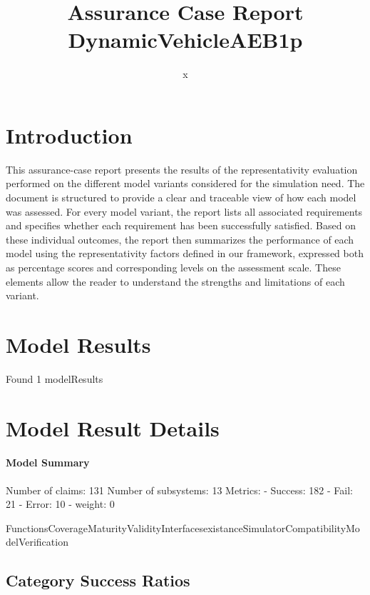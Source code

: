\documentclass{article}
\title{Assurance Case Report DynamicVehicleAEB1p}
\author{x}
\begin{document}
	\maketitle
	\section{Introduction}
	This assurance-case report presents the results of the 
	representativity evaluation performed on the different model variants considered for 
	the simulation need. The document is structured to provide a clear and traceable view of how 
	each model was assessed. For every model variant, the report lists all associated requirements
	 and specifies whether each requirement has been successfully satisfied. Based on these 
	individual outcomes, the report then summarizes the performance of each model using the 
	representativity factors defined in our framework, expressed both as percentage scores 
	and corresponding levels on the assessment scale. These elements allow the reader to understand 
	the strengths and limitations of each variant.
	 
	\section{Model Results}
    Found 1 modelResults
		
			\section{Model Result Details} 
			\paragraph{Model Summary}
			Number of claims: 131
			Number of subsystems: 13
			Metrics:
			- Success: 182
			- Fail: 21
			- Error: 10
			- weight: 0
			
			FunctionsCoverageMaturityValidityInterfacesexistanceSimulatorCompatibilityModelVerification

					\subsection{Category Success Ratios}
						
\end{document}
